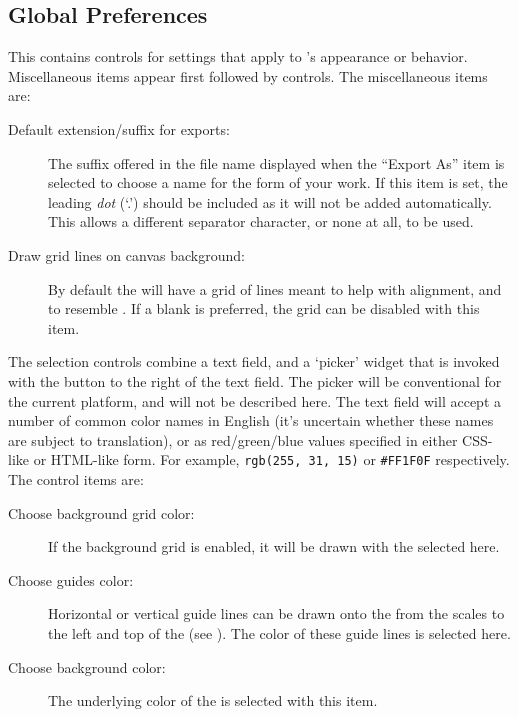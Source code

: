 		\subsection{Global Preferences}%
		\label{ssec:prefs_global}
		This  contains controls for settings that
		apply to \IXpkg{}'s appearance or behavior.
		Miscellaneous items appear first followed by
		  controls.
		The miscellaneous items are:
		
			\begin{description}
			  \item[Default extension/suffix for exports:] The
			  suffix offered in the file name 
			  displayed when the ``Export As'' 
			  item is selected to choose a name for the
			  \IXpov{}  form of your work.
			  If this item is set, the leading \emph{dot}
			  (`.') should be included as it will not be
			  added automatically. This allows a different
			  separator character, or none at all, to be used.
			  \item[Draw grid lines on canvas background:] By
			  default the  will have a
			  grid of lines meant to help with alignment, and
			  to resemble . If a blank
			   is preferred, the grid can be
			  disabled with this item.
			\end{description}

			The  selection controls combine a
			text field, and a `picker' widget that is invoked
			with the button to the right of the text field.
			The picker will be conventional for the current
			platform, and will not be described here. The text
			field will accept a number of common color names in
			English (it's uncertain whether these names are
			subject to translation), or as red/green/blue values
			specified in either CSS-like or HTML-like form.
			For example, \texttt{rgb(255, 31, 15)} or
			\texttt{\#FF1F0F}
			respectively. The  control items are:
			\begin{description}
			  \item[Choose background grid color:] If the
			  background grid is enabled, it will be drawn
			  with the  selected here.
			  \item[Choose guides color:] Horizontal or vertical
			  guide lines can be drawn onto the 
			  from the scales to the left and top of the
			   (see ).
			  The color of these guide lines is selected here.
			  \item[Choose background color:] The underlying
			  color of the
			   is selected with this item.
			\end{description}

